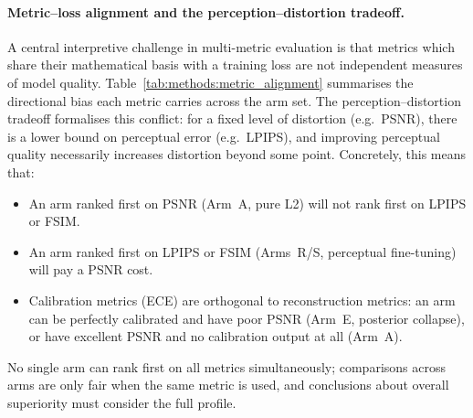\documentclass[12pt, a4paper, twoside, openright]{book}
\begin{document}
\paragraph{Metric--loss alignment and the perception--distortion tradeoff.}
A central interpretive challenge in multi-metric evaluation is that metrics which share their mathematical basis with a training loss are not independent measures of model quality. Table~\ref{tab:methods:metric_alignment} summarises the directional bias each metric carries across the arm set. The perception--distortion tradeoff \cite{blau_perception_2018} formalises this conflict: for a fixed level of distortion (e.g.\ PSNR), there is a lower bound on perceptual error (e.g.\ LPIPS), and improving perceptual quality necessarily increases distortion beyond some point. Concretely, this means that:
\begin{itemize}
  \item An arm ranked first on PSNR (Arm~A, pure L2) will not rank first on LPIPS or FSIM.
  \item An arm ranked first on LPIPS or FSIM (Arms~R/S, perceptual fine-tuning) will pay a PSNR cost.
  \item Calibration metrics (ECE) are orthogonal to reconstruction metrics: an arm can be perfectly calibrated and have poor PSNR (Arm~E, posterior collapse), or have excellent PSNR and no calibration output at all (Arm~A).
\end{itemize}
No single arm can rank first on all metrics simultaneously; comparisons across arms are only fair when the same metric is used, and conclusions about overall superiority must consider the full profile.
\end{document}
